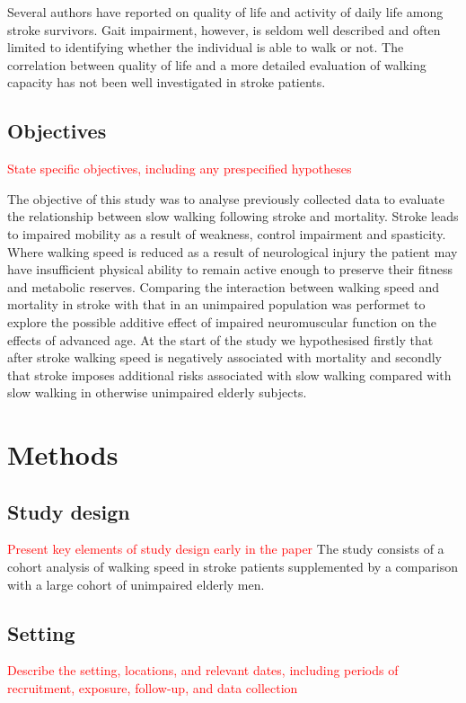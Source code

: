 \documentclass[a4paper,12pt]{article}
\begin{document}
Several authors have reported on quality of life and activity of daily life among stroke survivors. Gait impairment, however, is seldom well described and often limited to identifying whether the individual is able to walk or not. The correlation between quality of life and a more detailed evaluation of walking capacity has not been well investigated in stroke patients\cite{King1996a,Loewen1990,Viitanen1988a}.


\subsection{Objectives} \textcolor{red}{ State specific objectives, including any prespecified hypotheses} 

The objective of this study was to analyse previously collected data to evaluate the relationship between slow walking following stroke and mortality. Stroke leads to impaired mobility as a result of weakness, control impairment and spasticity. Where walking speed is reduced as a result of neurological injury the patient may have insufficient physical ability to remain active enough to preserve their fitness and metabolic reserves. Comparing the interaction between walking speed and mortality in stroke with that in an unimpaired population was performet to explore the possible additive effect of impaired neuromuscular function on the effects of advanced age. At the start of the study we hypothesised firstly that after stroke walking speed is negatively associated with mortality and secondly that stroke imposes additional risks associated with slow walking compared with slow walking in otherwise unimpaired elderly subjects.

\section{Methods}
\subsection{Study design} \textcolor{red}{ Present key elements of study design early in the paper} 
The study consists of a cohort analysis of walking speed in stroke patients supplemented by a comparison with a large cohort of unimpaired elderly men. 
\subsection{Setting} \textcolor{red}{ Describe the setting, locations, and relevant dates, including periods of recruitment, exposure, follow-up, and data collection} 
 
\end{document}
